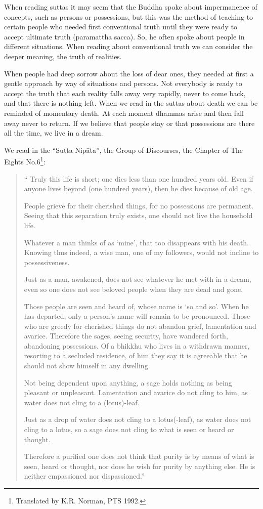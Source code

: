When reading suttas it may seem that the Buddha spoke about impermanence
of concepts, such as persons or possessions, but this was the method of
teaching to certain people who needed first conventional truth until
they were ready to accept ultimate truth (paramattha sacca). So, he
often spoke about people in different situations. When reading about
conventional truth we can consider the deeper meaning, the truth of
realities.

When people had deep sorrow about the loss of dear ones, they needed at
first a gentle approach by way of situations and persons. Not everybody
is ready to accept the truth that each reality falls away very rapidly,
never to come back, and that there is nothing left. When we read in the
suttas about death we can be reminded of momentary death. At each moment
dhammas arise and then fall away never to return. If we believe that
people stay or that possessions are there all the time, we live in a
dream.

We read in the ``Sutta Nipāta'', the Group of Discourses, the Chapter of The Eights No.6\footnote{Translated by K.R.
Norman, PTS 1992.}:

\begin{quote}
`` Truly this life is short; one dies less than one hundred years old.
Even if anyone lives beyond (one hundred years), then he dies because of
old age.

People grieve for their cherished things, for no possessions are
permanent. Seeing that this separation truly exists, one should not live
the household life.

Whatever a man thinks of as `mine', that too disappears with his death.
Knowing thus indeed, a wise man, one of my followers, would not incline
to possessiveness.

Just as a man, awakened, does not see whatever he met with in a dream,
even so one does not see beloved people when they are dead and gone.

Those people are seen and heard of, whose name is `so and so'. When he
has departed, only a person's name will remain to be pronounced. Those
who are greedy for cherished things do not abandon grief, lamentation
and avarice. Therefore the sages, seeing security, have wandered forth,
abandoning possessions. Of a bhikkhu who lives in a withdrawn manner,
resorting to a secluded residence, of him they say it is agreeable that
he should not show himself in any dwelling.

Not being dependent upon anything, a sage holds nothing as being
pleasant or unpleasant. Lamentation and avarice do not cling to him, as
water does not cling to a (lotus)-leaf.

Just as a drop of water does not cling to a lotus(-leaf), as water does
not cling to a lotus, so a sage does not cling to what is seen or heard
or thought.

Therefore a purified one does not think that purity is by means of what
is seen, heard or thought, nor does he wish for purity by anything else.
He is neither empassioned nor dispassioned.''
\end{quote}

